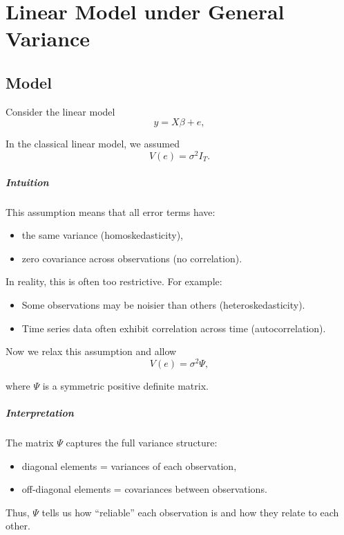 \chapter{Linear Model under General Variance}

\section{Model}

Consider the linear model
\[
y = X\beta + e,
\]

In the classical linear model, we assumed
\[
V(e)=\sigma^2 I_T.
\]

\paragraph{Intuition}
This assumption means that all error terms have:
\begin{itemize}
    \item the same variance (homoskedasticity),
    \item zero covariance across observations (no correlation).
\end{itemize}

In reality, this is often too restrictive. For example:
\begin{itemize}
    \item Some observations may be noisier than others (heteroskedasticity).
    \item Time series data often exhibit correlation across time (autocorrelation).
\end{itemize}

Now we relax this assumption and allow
\[
V(e)=\sigma^2 \Psi,
\]

where $\Psi$ is a symmetric positive definite matrix.

\paragraph{Interpretation}
The matrix $\Psi$ captures the full variance structure:
\begin{itemize}
    \item diagonal elements = variances of each observation,
    \item off-diagonal elements = covariances between observations.
\end{itemize}

Thus, $\Psi$ tells us how “reliable” each observation is and how they relate to each other.


